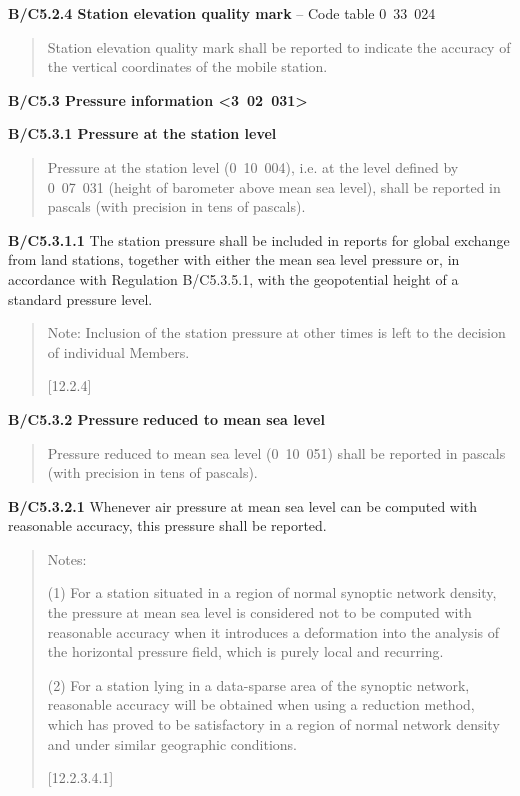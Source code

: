 \textbf{B/C5.2.4 Station elevation quality mark} -- Code table 0~33~024

\begin{quote}
Station elevation quality mark shall be reported to indicate the accuracy of the vertical coordinates of the mobile station.
\end{quote}

\textbf{B/C5.3 Pressure information \textless3~02~031\textgreater{}}

\textbf{B/C5.3.1 Pressure at the station level}

\begin{quote}
Pressure at the station level (0~10~004), i.e. at the level defined by 0~07~031 (height of barometer above mean sea level), shall be reported in pascals (with precision in tens of pascals).
\end{quote}

\textbf{B/C5.3.1.1} The station pressure shall be included in reports for global exchange from land stations, together with either the mean sea level pressure or, in accordance with Regulation B/C5.3.5.1, with the geopotential height of a standard pressure level.

\begin{quote}
Note: Inclusion of the station pressure at other times is left to the decision of individual Members.

{[}12.2.4{]}
\end{quote}

\textbf{B/C5.3.2 Pressure} \textbf{reduced to mean sea level}

\begin{quote}
Pressure reduced to mean sea level (0~10~051) shall be reported in pascals (with precision in tens of pascals).
\end{quote}

\textbf{B/C5.3.2.1} Whenever air pressure at mean sea level can be computed with reasonable accuracy, this pressure shall be reported.

\begin{quote}
Notes:

(1) For a station situated in a region of normal synoptic network density, the pressure at mean sea level is considered not to be computed with reasonable accuracy when it introduces a deformation into the analysis of the horizontal pressure field, which is purely local and recurring.

(2) For a station lying in a data-sparse area of the synoptic network, reasonable accuracy will be obtained when using a reduction method, which has proved to be satisfactory in a region of normal network density and under similar geographic conditions.

{[}12.2.3.4.1{]}
\end{quote}

